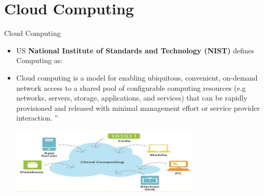 \documentclass{SKP-beamer}
\begin{document}
\section{\textbf{Cloud Computing}}



\begin{frame}{Cloud Computing}
	\begin{itemize}
	\item US \textbf{National Institute of Standards and Technology (NIST)} defines Computing as:
		\item Cloud computing is a model for enabling ubiquitous, convenient, on-demand network access to a shared pool of 
		configurable computing resources (e.g networks, servers, storage, applications, and services) that can be 
		rapidly provisioned and released with minimal management effort or service provider interaction. ”
		
		\includegraphics[scale=1.5]{11.png}
		
	\end{itemize}
\end{frame}
\end{document}
